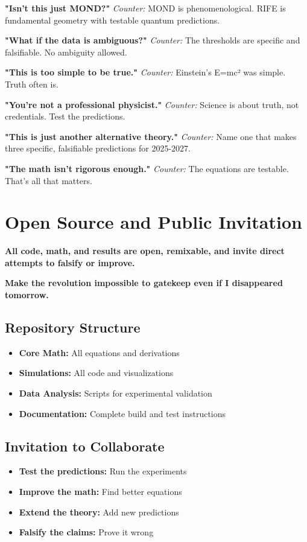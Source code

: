 \documentclass[11pt]{report}
\begin{document}
\textbf{"Isn't this just MOND?"}
\textit{Counter:} MOND is phenomenological. RIFE is fundamental geometry with testable quantum predictions.

\textbf{"What if the data is ambiguous?"}
\textit{Counter:} The thresholds are specific and falsifiable. No ambiguity allowed.

\textbf{"This is too simple to be true."}
\textit{Counter:} Einstein's E=mc² was simple. Truth often is.

\textbf{"You're not a professional physicist."}
\textit{Counter:} Science is about truth, not credentials. Test the predictions.

\textbf{"This is just another alternative theory."}
\textit{Counter:} Name one that makes three specific, falsifiable predictions for 2025-2027.

\textbf{"The math isn't rigorous enough."}
\textit{Counter:} The equations are testable. That's all that matters.

\section{Open Source and Public Invitation}

\textbf{All code, math, and results are open, remixable, and invite direct attempts to falsify or improve.}

\textbf{Make the revolution impossible to gatekeep even if I disappeared tomorrow.}

\subsection{Repository Structure}
\begin{itemize}
\item \textbf{Core Math:} All equations and derivations
\item \textbf{Simulations:} All code and visualizations
\item \textbf{Data Analysis:} Scripts for experimental validation
\item \textbf{Documentation:} Complete build and test instructions
\end{itemize}

\subsection{Invitation to Collaborate}
\begin{itemize}
\item \textbf{Test the predictions:} Run the experiments
\item \textbf{Improve the math:} Find better equations
\item \textbf{Extend the theory:} Add new predictions
\item \textbf{Falsify the claims:} Prove it wrong
\end{itemize}
\end{document}
